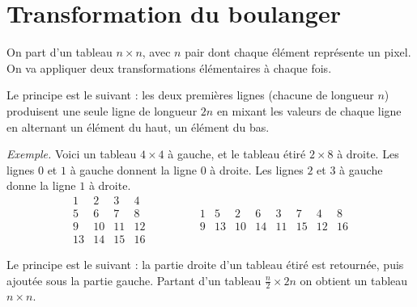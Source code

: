 \documentclass[12pt,class=report,crop=false]{standalone}
\begin{document}
\newpage

 
 
\section*{Transformation du boulanger}

On part d'un tableau $n\times n$, avec $n$ pair dont chaque élément représente un pixel. 
On va appliquer deux transformations élémentaires à chaque fois.

 Le principe est le suivant : les deux premières lignes (chacune de longueur $n$) produisent une seule ligne de longueur $2n$ en mixant les valeurs de chaque ligne en alternant un élément du haut, un élément du bas.

\medskip
 



\medskip


\newpage


\emph{Exemple.} Voici un tableau $4 \times 4$ à gauche, et le tableau étiré $2 \times 8$ à droite.
Les lignes $0$ et $1$ à gauche donnent la ligne $0$ à droite.
Les lignes $2$ et $3$ à gauche donne la ligne $1$ à droite.
$$\begin{array}{cccc} 
  1& 2& 3& 4\\ 
  5& 6& 7& 8\\  
  9&10&11&12\\  
 13&14&15&16  
\end{array}\qquad\qquad 
\begin{array}{cccccccc} 
  1& 5& 2& 6& 3& 7& 4& 8  \\
  9&13&10&14&11&15&12&16
\end{array}$$
  
 \newpage 
  
 Le principe est le suivant : la partie droite d'un tableau étiré est retournée, puis ajoutée sous la partie gauche. Partant d'un tableau $\frac n2 \times 2n$ on obtient un tableau $n \times n$.

 

\end{document}
